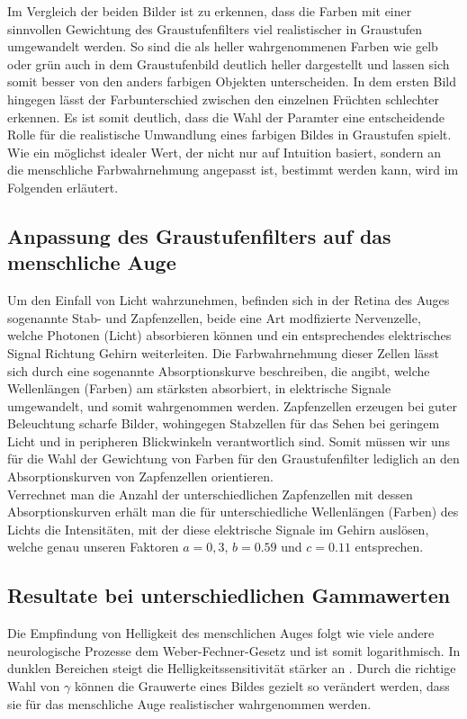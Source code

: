 \documentclass[course=erap]{aspdoc}
\begin{document}
	\noindent Im Vergleich der beiden Bilder ist zu erkennen, dass die Farben mit einer sinnvollen Gewichtung des Graustufenfilters viel realistischer in Graustufen umgewandelt werden. So sind die als heller wahrgenommenen Farben wie gelb oder grün auch in dem Graustufenbild deutlich heller dargestellt und lassen sich somit besser von den anders farbigen Objekten unterscheiden. In dem ersten Bild hingegen lässt der Farbunterschied zwischen den einzelnen Früchten schlechter erkennen. Es ist somit deutlich, dass die Wahl der Paramter eine entscheidende Rolle für die realistische Umwandlung eines farbigen Bildes in Graustufen spielt. Wie ein möglichst idealer Wert, der nicht nur auf Intuition basiert, sondern an die menschliche Farbwahrnehmung angepasst ist, bestimmt werden kann, wird im Folgenden erläutert.
	\subsection{Anpassung des Graustufenfilters auf das menschliche Auge}
	Um den Einfall von Licht wahrzunehmen, befinden sich in der Retina des Auges sogenannte Stab- und Zapfenzellen, beide eine Art modfizierte Nervenzelle, welche Photonen (Licht) absorbieren können und ein entsprechendes elektrisches Signal Richtung Gehirn weiterleiten.
	Die Farbwahrnehmung dieser Zellen lässt sich durch eine sogenannte Absorptionskurve beschreiben, die angibt, welche Wellenlängen (Farben) am stärksten absorbiert, in elektrische Signale umgewandelt, und somit wahrgenommen werden.
	Zapfenzellen erzeugen bei guter Beleuchtung scharfe Bilder, wohingegen Stabzellen für das Sehen bei geringem Licht und in peripheren Blickwinkeln verantwortlich sind. Somit müssen wir uns für die Wahl der Gewichtung von Farben für den Graustufenfilter lediglich an den Absorptionskurven von Zapfenzellen orientieren.\\
	Verrechnet man die Anzahl der unterschiedlichen Zapfenzellen mit dessen Absorptionskurven erhält man die für unterschiedliche Wellenlängen (Farben) des Lichts die Intensitäten, mit der diese elektrische Signale im Gehirn auslösen, welche genau unseren Faktoren $a = 0,3$, $b = 0.59$ und $c = 0.11$ entsprechen.
	
	\subsection{Resultate bei unterschiedlichen Gammawerten}
	Die Empfindung von Helligkeit des menschlichen Auges folgt wie viele andere neurologische Prozesse dem Weber-Fechner-Gesetz \cite{weberFechnerGesetz} und ist somit logarithmisch. In dunklen Bereichen steigt die Helligkeitssensitivität stärker an \cite{Logarithmische_Helligkeitswahrnehmung}. Durch die richtige Wahl von $\gamma$ können die Grauwerte eines Bildes gezielt so verändert werden, dass sie für das menschliche Auge realistischer wahrgenommen werden. \\
\end{document}
